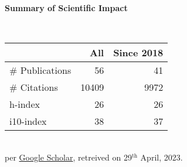 \headedsection %
{\bf Summary of Scientific Impact}{}{}
{
    \qquad~~~~
    \begin{minipage}[t]{0.6\textwidth}
        \begin{tabular}{lrr}
        \hline
         & All & Since 2018\\
        \hline
        \# Publications & 56     & 41    \\
        \# Citations    & 10409  & 9972  \\
        h-index         & 26     & 26    \\
        i10-index       & 38     & 37    \\
        \hline
    \end{tabular}
    \\
    {\footnotesize{
        per \href{https://scholar.google.com/citations?user=wpLQuroAAAAJ}{Google Scholar},
        retreived on 29$^\text{th}$ April, 2023.
        }
    }
    \end{minipage}
     
}